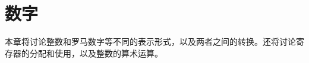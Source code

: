\documentclass{book}
\begin{document}
\chapter{数字}\label{number}

本章将讨论整数和罗马数字等不同的表示形式，以及两者之间的转换。还将讨论寄存器的分配和使用，以及整数的算术运算。

\label{cschap:number}\label{cschap:romannumeral}\label{cschap:count}\label{cschap:countdef}\label{cschap:newcount}\label{cschap:advance}\label{cschap:multiply}\label{cschap:divide}
\end{document}
